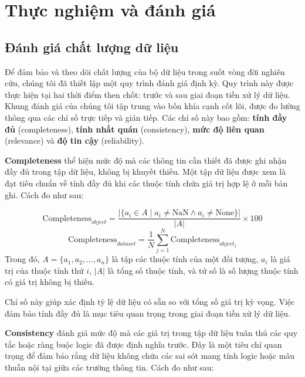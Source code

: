 \chapter{Thực nghiệm và đánh giá}
\label{chap:chap5}
\section{Đánh giá chất lượng dữ liệu}

Để đảm bảo và theo dõi chất lượng của bộ dữ liệu trong suốt vòng đời nghiên cứu, chúng tôi đã thiết lập một quy trình đánh giá định kỳ. Quy trình này được thực hiện tại hai thời điểm then chốt: trước và sau giai đoạn tiền xử lý dữ liệu. Khung đánh giá của chúng tôi tập trung vào bốn khía cạnh cốt lõi, được đo lường thông qua các chỉ số trực tiếp và gián tiếp. Các chỉ số này bao gồm: \textbf{tính đầy đủ} (completeness), \textbf{tính nhất quán} (consistency), \textbf{mức độ liên quan} (relevance) và \textbf{độ tin cậy} (reliability). 

\textbf{Completeness}\cite{nguyen2025data} thể hiện mức độ mà các thông tin cần thiết đã được ghi nhận đầy đủ trong tập dữ liệu, không bị khuyết thiếu. Một tập dữ liệu được xem là đạt tiêu chuẩn về tính đầy đủ khi các thuộc tính chứa giá trị hợp lệ ở mỗi bản ghi. Cách đo như sau: 

\begin{equation}
\text{Completeness}_{object} = \frac{|\{ a_i \in A \mid a_i \neq \text{NaN} \land a_i \neq \text{None} \}|}{|A|} \times 100
\end{equation}
\begin{equation}
\text{Completeness}_{dataset} = \frac{1}{N} \sum_{j=1}^{N} \text{Completeness}_{object_j}
\end{equation}
Trong đó, $A = \{a_1, a_2, \ldots, a_n\}$ là tập các thuộc tính của một đối tượng, $a_i$ là giá trị của thuộc tính thứ $i$, $|A|$ là tổng số thuộc tính, và tử số là số lượng thuộc tính có giá trị không bị thiếu.

Chỉ số này giúp xác định tỷ lệ dữ liệu có sẵn so với tổng số giá trị kỳ vọng. Việc đảm bảo tính đầy đủ là mục tiêu quan trọng trong giai đoạn tiền xử lý dữ liệu.


\textbf{Consistency} \cite{nguyen2025data} đánh giá mức độ mà các giá trị trong tập dữ liệu tuân thủ các quy tắc hoặc ràng buộc logic đã được định nghĩa trước. Đây là một tiêu chí quan trọng để đảm bảo rằng dữ liệu không chứa các sai sót mang tính logic hoặc mâu thuẫn nội tại giữa các trường thông tin. Cách đo như sau:

